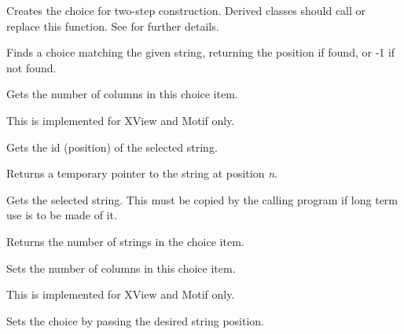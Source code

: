 Creates the choice for two-step construction. Derived classes
should call or replace this function. See \rtfsp
for further details.



Finds a choice matching the given string, returning the position if found, or
-1 if not found.



Gets the number of columns in this choice item.

This is implemented for XView and Motif only.



Gets the id (position) of the selected string.



Returns a temporary pointer to the string at position {\it n}.



Gets the selected string. This must be copied by the calling program
if long term use is to be made of it.



Returns the number of strings in the choice item.



Sets the number of columns in this choice item.

This is implemented for XView and Motif only.



Sets the choice by passing the desired string position. 



